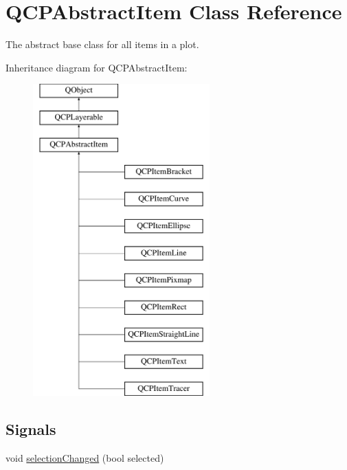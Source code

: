 \hypertarget{classQCPAbstractItem}{\section{Q\-C\-P\-Abstract\-Item Class Reference}
\label{classQCPAbstractItem}
}


The abstract base class for all items in a plot.  


Inheritance diagram for Q\-C\-P\-Abstract\-Item\-:\begin{figure}[H]
\begin{center}
\leavevmode
\includegraphics[height=12.000000cm]{classQCPAbstractItem}
\end{center}
\end{figure}
\subsection*{Signals}
\begin{DoxyCompactItemize}
\item 
void \hyperlink{classQCPAbstractItem_aa5cffb034fc65dbb91c77e02c1c14251}{selection\-Changed} (bool selected)
\end{DoxyCompactItemize}
